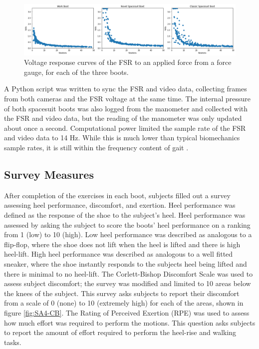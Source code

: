 \documentclass[defaultstyle,11pt]{thesis}
\begin{document}
\begin{figure}
\hypertarget{fig:SA4-FSRcal}{%
\centering
\includegraphics[width=1\textwidth,height=\textheight]{../fig/SA4/FSR_cal.png}
\caption{Voltage response curves of the FSR to an applied force from a force gauge, for each of the three boots.}\label{fig:SA4-FSRcal}
}
\end{figure}

A Python script was written to sync the FSR and video data, collecting frames from both cameras and the FSR voltage at the same time.
The internal pressure of both spacesuit boots was also logged from the manometer and collected with the FSR and video data, but the reading of the manometer was only updated about once a second.
Computational power limited the sample rate of the FSR and video data to 14 Hz.
While this is much lower than typical biomechanics sample rates, it is still within the frequency content of gait \citep{Antonsson1985}.

\hypertarget{survey-measures}{%
\subsection{Survey Measures}\label{survey-measures}}

After completion of the exercises in each boot, subjects filled out a survey assessing heel performance, discomfort, and exertion.
Heel performance was defined as the response of the shoe to the subject's heel.
Heel performance was assessed by asking the subject to score the boots' heel performance on a ranking from 1 (low) to 10 (high).
Low heel performance was described as analogous to a flip-flop, where the shoe does not lift when the heel is lifted and there is high heel-lift.
High heel performance was described as analogous to a well fitted sneaker, where the shoe instantly responds to the subjects heel being lifted and there is minimal to no heel-lift.
The Corlett-Bishop Discomfort Scale \citep{Corlett1976} was used to assess subject discomfort; the survey was modified and limited to 10 areas below the knees of the subject.
This survey asks subjects to report their discomfort from a scale of 0 (none) to 10 (extremely high) for each of the areas, shown in figure \ref{fig:SA4-CB}.
The Rating of Perceived Exertion (RPE) \citep{Borg1982} was used to assess how much effort was required to perform the motions.
This question asks subjects to report the amount of effort required to perform the heel-rise and walking tasks.
\end{document}
